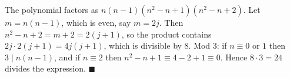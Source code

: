 The polynomial factors as $n(n-1)\left(n^2-n+1\right)\left(n^2-n+2\right)$. Let $m=n(n-1)$, which is even, say $m=2j$. Then $n^2-n+2=m+2=2(j+1)$, so the product contains $2j\cdot2(j+1)=4j(j+1)$, which is divisible by $8$. Mod $3$: if $n\equiv0$ or $1$ then $3\mid n(n-1)$, and if $n\equiv2$ then $n^2-n+1\equiv4-2+1\equiv0$. Hence $8\cdot3=24$ divides the expression. $\blacksquare$
